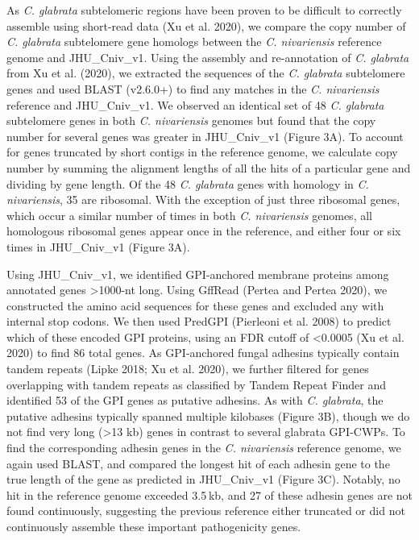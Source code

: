 As \textit{C. glabrata} subtelomeric regions have been proven to be difficult to correctly assemble using short-read data (Xu et al. 2020), we compare the copy number of \textit{C. glabrata} subtelomere gene homologs between the \textit{C. nivariensis} reference genome and JHU\_Cniv\_v1. Using the assembly and re-annotation of \textit{C. glabrata} from Xu et al. (2020), we extracted the sequences of the \textit{C. glabrata} subtelomere genes and used BLAST (v2.6.0+) to find any matches in the \textit{C. nivariensis} reference and JHU\_Cniv\_v1. We observed an identical set of 48 \textit{C. glabrata} subtelomere genes in both \textit{C. nivariensis} genomes but found that the copy number for several genes was greater in JHU\_Cniv\_v1 (Figure 3A). To account for genes truncated by short contigs in the reference genome, we calculate copy number by summing the alignment lengths of all the hits of a particular gene and dividing by gene length. Of the 48 \textit{C. glabrata} genes with homology in \textit{C. nivariensis}, 35 are ribosomal. With the exception of just three ribosomal genes, which occur a similar number of times in both \textit{C. nivariensis} genomes, all homologous ribosomal genes appear once in the reference, and either four or six times in JHU\_Cniv\_v1 (Figure 3A).

Using JHU\_Cniv\_v1, we identified GPI-anchored membrane proteins among annotated genes >1000-nt long. Using GffRead (Pertea and Pertea 2020), we constructed the amino acid sequences for these genes and excluded any with internal stop codons. We then used PredGPI (Pierleoni et al. 2008) to predict which of these encoded GPI proteins, using an FDR cutoff of <0.0005 (Xu et al. 2020) to find 86 total genes. As GPI-anchored fungal adhesins typically contain tandem repeats (Lipke 2018; Xu et al. 2020), we further filtered for genes overlapping with tandem repeats as classified by Tandem Repeat Finder and identified 53 of the GPI genes as putative adhesins. As with \textit{C. glabrata}, the putative adhesins typically spanned multiple kilobases (Figure 3B), though we do not find very long (>13 kb) genes in contrast to several glabrata GPI-CWPs. To find the corresponding adhesin genes in the \textit{C. nivariensis} reference genome, we again used BLAST, and compared the longest hit of each adhesin gene to the true length of the gene as predicted in JHU\_Cniv\_v1 (Figure 3C). Notably, no hit in the reference genome exceeded 3.5 kb, and 27 of these adhesin genes are not found continuously, suggesting the previous reference either truncated or did not continuously assemble these important pathogenicity genes.

